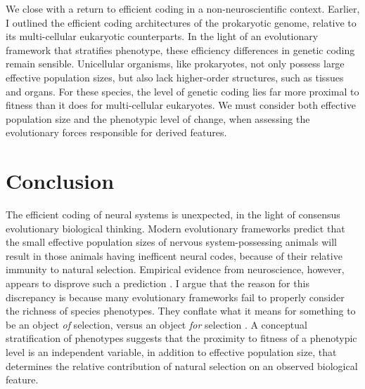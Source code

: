 \documentclass[twocolumn]{article}
\begin{document}
We close with a return to efficient coding in a non-neuroscientific context. Earlier, I outlined the efficient coding architectures of the prokaryotic genome, relative to its multi-cellular eukaryotic counterparts. In the light of an evolutionary framework that stratifies phenotype, these efficiency differences in genetic coding remain sensible. Unicellular organisms, like prokaryotes, not only possess large effective population sizes, but also lack higher-order structures, such as tissues and organs. For these species, the level of genetic coding lies far more proximal to fitness than it does for multi-cellular eukaryotes. We must consider both effective population size and the phenotypic level of change, when assessing the evolutionary forces responsible for derived features. 


\section{Conclusion}
The efficient coding of neural systems is unexpected, in the light of consensus evolutionary biological thinking. Modern evolutionary frameworks predict that the small effective population sizes of nervous system-possessing animals will result in those animals having inefficent neural codes, because of their relative immunity to natural selection. Empirical evidence from neuroscience, however, appears to disprove such a prediction \cite{smith_lewicki_2006, olshausen_field_1996, Machens_Gollisch_Kolesnikova_Herz_2005, Pitkow_Meister_2012, barlow_1952, fairhall_deRuyterVan_2001}. I argue that the reason for this discrepancy is because many evolutionary frameworks fail to properly consider the richness of species phenotypes. They conflate what it means for something to be an object \textit{of} selection, versus an object \textit{for} selection \cite{sober1993nature, mayr_1997}. A conceptual stratification of phenotypes suggests that the proximity to fitness of a phenotypic level is an independent variable, in addition to effective population size, that determines the relative contribution of natural selection on an observed biological feature. 
\end{document}
